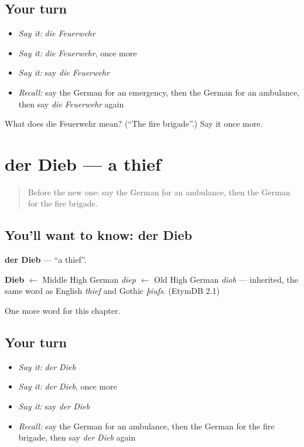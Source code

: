\subsection*{Your turn}
\begin{itemize}
\raggedright
  \item \emph{Say it:} \emph{die Feuerwehr}
  \item \emph{Say it:} \emph{die Feuerwehr}, once more
  \item \emph{Say it:} say \emph{die Feuerwehr}
  \item \emph{Recall:} say the German for an emergency, then the German for an ambulance, then say \emph{die Feuerwehr} again
\end{itemize}

\begin{tcolorbox}[breakable,colback=teal!4,colframe=teal!35!black,title={Before you move on}]
What does die Feuerwehr mean? (\textquotedblleft{}The fire brigade\textquotedblright{}.) Say it once more.
\end{tcolorbox}
\section[der Dieb]{der Dieb — a thief}

\label{lesson:GE-C207-dieb}



\begin{quote}
Before the new one: say the German for an ambulance, then the German for the fire brigade.
\end{quote}

\subsection*{You'll want to know: der Dieb}
\textbf{der Dieb} — \textquotedblleft{}a thief\textquotedblright{}.

\begin{cousinweb}
\textbf{Dieb} $\leftarrow$ Middle High German \emph{diep} $\leftarrow$ Old High German \emph{diob} — inherited, the same word as English \emph{thief} and Gothic \emph{þiufs}. (EtymDB 2.1)
\end{cousinweb}

\begin{grammarlens}[title={What you've built}]
One more word for this chapter.
\end{grammarlens}

\subsection*{Your turn}
\begin{itemize}
\raggedright
  \item \emph{Say it:} \emph{der Dieb}
  \item \emph{Say it:} \emph{der Dieb}, once more
  \item \emph{Say it:} say \emph{der Dieb}
  \item \emph{Recall:} say the German for an ambulance, then the German for the fire brigade, then say \emph{der Dieb} again
\end{itemize}

